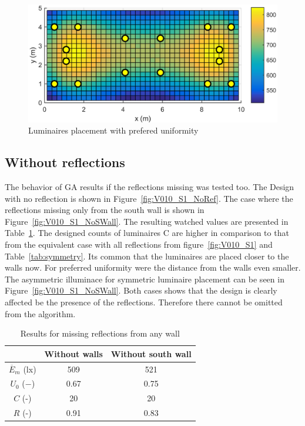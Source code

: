\begin{figure}[tb]
  \centering
  \includegraphics[width=\columnwidth]{../Vysledky/MSTR_SLB_4x18W_5G4_Fit2_U_V010_S1}
  \caption{Luminaires placement with prefered uniformity}
  \label{fig:V010_S1_U}
\end{figure}

\subsection{Without reflections}

The behavior of GA results if the reflections missing was tested too. The Design with no reflection is shown in Figure~\ref{fig:V010_S1_NoRef}. The case where the reflections missing only from the south wall is shown in Figure~\ref{fig:V010_S1_NoSWall}. The resulting watched values are presented in Table~\ref{tab:noRef}. The designed counts of luminaires C are higher in comparison to that from the equivalent case with all reflections from figure~\ref{fig:V010_S1} and Table~\ref{tab:symmetry}. Its common that the luminaires are placed closer to the walls now. For preferred uniformity were the distance from the walls even smaller. The asymmetric illuminace for symmetric luminaire placement can be seen in Figure~\ref{fig:V010_S1_NoSWall}. Both cases shows that the design is clearly affected be the presence of the reflections. Therefore there cannot be omitted from the algorithm.

\begin{table}[tb]
	\renewcommand{\arraystretch}{1.8}
	\caption{Results for missing reflections from any wall}
 	\label{tab:noRef}
	\centering
  \begin{tabular}{| c | c | c |}
    \hline
    & \textbf{Without walls} & \textbf{Without south wall} \\
    \hline
    $\overline{E}_{m}$ (lx) & 509 & 521 \\
    \hline
		$U_0$ ($-$)& 0.67 & 0.75 \\
    \hline
		$C$ (-) & 20 & 20 \\
	\hline
		$R$ (-) & 0.91 & 0.83 \\
  \hline
  \end{tabular}
\end{table}

